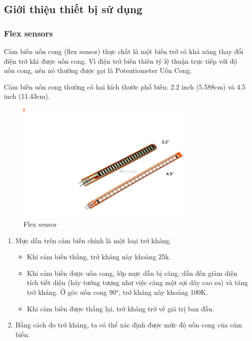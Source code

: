 \subsection{Giới thiệu thiết bị sử dụng}

\subsubsection{Flex sensors}


\indent Cảm biến uốn cong (flex sensor) thực chất là một biến trở có khả năng thay đổi điện trở khi được uốn cong. Vì điện trở biến thiên tỷ lệ thuận trực tiếp với độ uốn cong, nên nó thường được gọi là Potentiometer Uốn Cong.

\indent Cảm biến uốn cong thường có hai kích thước phổ biến: 2.2 inch (5.588cm) và 4.5 inch (11.43cm).

\begin{figure}[H]
    \centering
    \includegraphics[width=9cm]{Images/Theoretical basis/flex sensor.png}
\caption{Flex sensor}
\end{figure}


\begin{enumerate}[-]
    \item Mực dẫn trên cảm biến chính là một loại trở kháng. 
    \begin{itemize}
        \item Khi cảm biến thẳng, trở kháng này khoảng 25k.
        \item Khi cảm biến được uốn cong, lớp mực dẫn bị căng, dẫn đến giảm diện tích tiết diện (hãy tưởng tượng như việc căng một sợi dây cao su) và tăng trở kháng. Ở góc uốn cong 90°, trở kháng này khoảng 100K.
        \item Khi cảm biến được thẳng lại, trở kháng trở về giá trị ban đầu.
    \end{itemize}
    \item  Bằng cách đo trở kháng, ta có thể xác định được mức độ uốn cong của cảm biến.
\end{enumerate}

